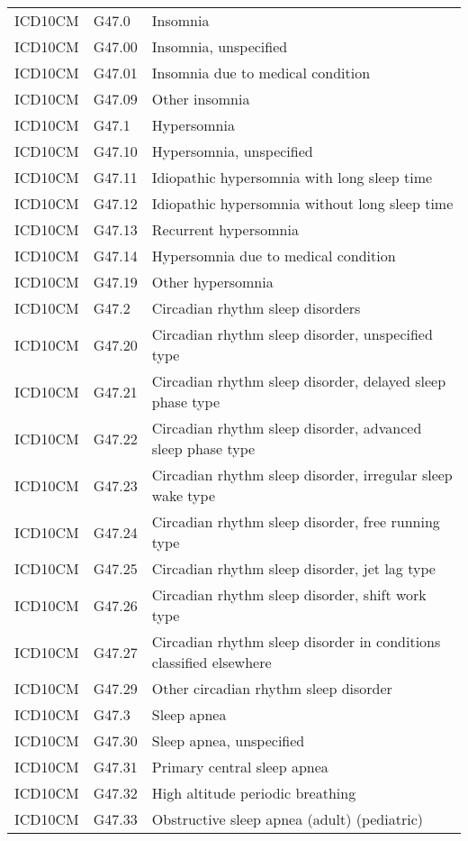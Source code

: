 \begin{longtable}{p{}p{}p{}}
  ICD10CM & G47.0 & Insomnia \\ 
  ICD10CM & G47.00 & Insomnia, unspecified \\ 
  ICD10CM & G47.01 & Insomnia due to medical condition \\ 
  ICD10CM & G47.09 & Other insomnia \\ 
  ICD10CM & G47.1 & Hypersomnia \\ 
  ICD10CM & G47.10 & Hypersomnia, unspecified \\ 
  ICD10CM & G47.11 & Idiopathic hypersomnia with long sleep time \\ 
  ICD10CM & G47.12 & Idiopathic hypersomnia without long sleep time \\ 
  ICD10CM & G47.13 & Recurrent hypersomnia \\ 
  ICD10CM & G47.14 & Hypersomnia due to medical condition \\ 
  ICD10CM & G47.19 & Other hypersomnia \\ 
  ICD10CM & G47.2 & Circadian rhythm sleep disorders \\ 
  ICD10CM & G47.20 & Circadian rhythm sleep disorder, unspecified type \\ 
  ICD10CM & G47.21 & Circadian rhythm sleep disorder, delayed sleep phase type \\ 
  ICD10CM & G47.22 & Circadian rhythm sleep disorder, advanced sleep phase type \\ 
  ICD10CM & G47.23 & Circadian rhythm sleep disorder, irregular sleep wake type \\ 
  ICD10CM & G47.24 & Circadian rhythm sleep disorder, free running type \\ 
  ICD10CM & G47.25 & Circadian rhythm sleep disorder, jet lag type \\ 
  ICD10CM & G47.26 & Circadian rhythm sleep disorder, shift work type \\ 
  ICD10CM & G47.27 & Circadian rhythm sleep disorder in conditions classified elsewhere \\ 
  ICD10CM & G47.29 & Other circadian rhythm sleep disorder \\ 
  ICD10CM & G47.3 & Sleep apnea \\ 
  ICD10CM & G47.30 & Sleep apnea, unspecified \\ 
  ICD10CM & G47.31 & Primary central sleep apnea \\ 
  ICD10CM & G47.32 & High altitude periodic breathing \\ 
  ICD10CM & G47.33 & Obstructive sleep apnea (adult) (pediatric) \\ 

\end{longtable}
